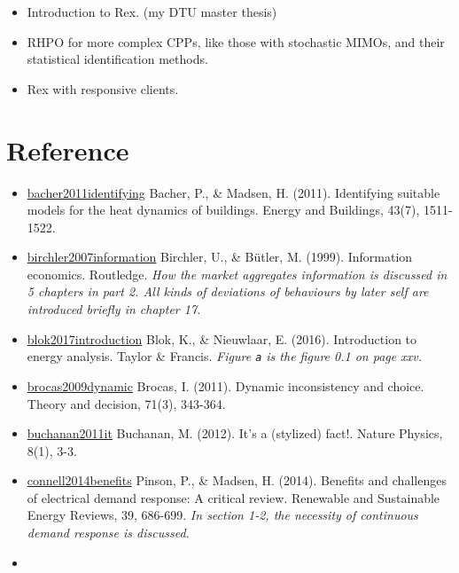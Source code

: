 \documentclass[letterpaper,8pt,twocolumn,twoside,]{pinp}
\providecommand{\tightlist}{%
  \setlength{\itemsep}{0pt}\setlength{\parskip}{0pt}}
\begin{document}
\begin{itemize}
\tightlist
\item
  Introduction to Rex. (my DTU master thesis)
\item
  RHPO for more complex CPPs, like those with stochastic MIMOs, and
  their statistical identification methods.
\item
  Rex with responsive clients.
\end{itemize}

\hypertarget{reference}{%
\section{Reference}\label{reference}}

\begin{itemize}
\tightlist
\item
  \href{https://www.sciencedirect.com/science/article/pii/S0378778811000491}{bacher2011identifying}
  Bacher, P., \& Madsen, H. (2011). Identifying suitable models for the
  heat dynamics of buildings. Energy and Buildings, 43(7), 1511-1522.
\item
  \href{https://www.taylorfrancis.com/books/9780203946558}{birchler2007information}
  Birchler, U., \& Bütler, M. (1999). Information economics. Routledge.
  \emph{How the market aggregates information is discussed in 5 chapters
  in part 2. All kinds of deviations of behaviours by later self are
  introduced briefly in chapter 17.}
\item
  \href{https://www.taylorfrancis.com/books/9781315617213}{blok2017introduction}
  Blok, K., \& Nieuwlaar, E. (2016). Introduction to energy analysis.
  Taylor \& Francis. \emph{Figure \texttt{a} is the figure 0.1 on page
  xxv.}
\item
  \href{https://link.springer.com/article/10.1007/s11238-009-9183-x}{brocas2009dynamic}
  Brocas, I. (2011). Dynamic inconsistency and choice. Theory and
  decision, 71(3), 343-364.
\item
  \href{https://www.nature.com/articles/nphys2191}{buchanan2011it}
  Buchanan, M. (2012). It's a (stylized) fact!. Nature Physics, 8(1),
  3-3.
\item
  \href{https://www.sciencedirect.com/science/article/pii/S1364032114005504}{connell2014benefits}
  Pinson, P., \& Madsen, H. (2014). Benefits and challenges of
  electrical demand response: A critical review. Renewable and
  Sustainable Energy Reviews, 39, 686-699. \emph{In section 1-2, the
  necessity of continuous demand response is discussed.}
\item

\end{itemize}
\end{document}
